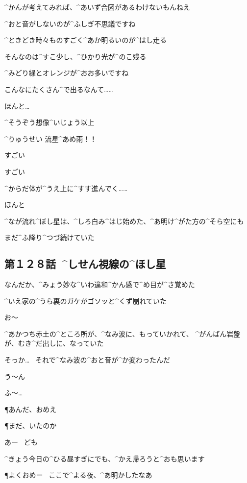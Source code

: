 \A ^{かんが}{考}えてみれば、^{あいず}{合図}があるわけないもんねえ

\K ^{おと}{音}がしないのが^{ふしぎ}{不思議}ですね

\page
\A ^{ときどき}{時々}ものすごく^{あか}{明}るいのが^{はし}{走}る

\A そんなのは^{すこ}{少}し、^{ひかり}{光}が^{のこ}{残}る

\K ^{みどり}{緑}とオレンジが^{おお}{多}いですね

\K こんなにたくさん^{で}{出}るなんて……

\A ほんと…

\A ^{そうぞう}{想像}^{いじょう}{以上}

\page[112]
\A ^{りゅうせい }{流星}^{あめ}{雨}！！

\A すごい

\K すごい

\page
\A ^{からだ}{体}が^{うえ}{上}に^{すす}{進}んでく……

\K ほんと

\page
\A ^{なが}{流}れ^{ぼし}{星}は、^{しろ}{白}み^{はじ}{始}めた、^{あ}{明}け^{がた}{方}の^{そら}{空}にも

\A まだ^{ふ}{降}り^{つづ}{続}けていた


\subsection{第１２８話\ ^{しせん}{視線}の^{ほし}{星}}

\page[116]
\A なんだか、^{みょう}{妙}な^{いわ}{違和}^{かん}{感}で^{め}{目}が^{さ}{覚}めた

\page
\A ^{いえ}{家}の^{うら}{裏}のガケがゴソッと^{くず}{崩}れていた

\A お〜

\A ^{あかつち}{赤土}の^{ところ}{所}が、^{なみ}{波}に、もっていかれて、
^{がんばん}{岩盤}が、むき^{だ}{出}しに、なっていた

\A そっか…
\ それで^{なみ}{波}の^{おと}{音}が^{か}{変}わったんだ

\A う〜ん

\page
\Y ふ〜…

\page[121]
\P あんだ、おめえ

\P まだ、いたのか

\Y あー
\ ども

\page
\Y ^{きょう}{今日}の^{ひる}{昼}すぎにでも、^{かえ}{帰}ろうと^{おも}{思}います

\P よくおめー
\ ここで^{よる}{夜}、^{あ}{明}かしたなあ

